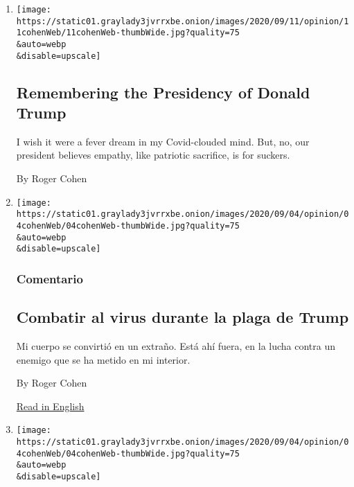 \begin{enumerate}
\def\labelenumi{\arabic{enumi}.}
\item
  \href{/2020/09/11/opinion/trump-lies-military-coronavirus.html}{}

  \texttt{[image: https://static01.graylady3jvrrxbe.onion/images/2020/09/11/opinion/11cohenWeb/11cohenWeb-thumbWide.jpg?quality=75\\\&auto=webp\\\&disable=upscale]}

  \hypertarget{remembering-the-presidency-of-donald-trump}{%
  \subsection{Remembering the Presidency of Donald
  Trump}\label{remembering-the-presidency-of-donald-trump}}

  I wish it were a fever dream in my Covid-clouded mind. But, no, our
  president believes empathy, like patriotic sacrifice, is for suckers.

  By Roger Cohen
\item
  \href{/es/2020/09/07/espanol/opinion/coronavirus-donald-trump.html}{}

  \texttt{[image: https://static01.graylady3jvrrxbe.onion/images/2020/09/04/opinion/04cohenWeb/04cohenWeb-thumbWide.jpg?quality=75\\\&auto=webp\\\&disable=upscale]}

  \hypertarget{comentario}{%
  \subsubsection{Comentario}\label{comentario}}

  \hypertarget{combatir-al-virus-durante-la-plaga-de-trump}{%
  \subsection{Combatir al virus durante la plaga de
  Trump}\label{combatir-al-virus-durante-la-plaga-de-trump}}

  Mi cuerpo se convirtió en un extraño. Está ahí fuera, en la lucha
  contra un enemigo que se ha metido en mi interior.

  By Roger Cohen

  \href{https://www.nytimes3xbfgragh.onion/2020/09/04/opinion/coronavius-donald-trump.html}{Read
  in English}
\item
  \href{/2020/09/04/opinion/coronavius-donald-trump.html}{}

  \texttt{[image: https://static01.graylady3jvrrxbe.onion/images/2020/09/04/opinion/04cohenWeb/04cohenWeb-thumbWide.jpg?quality=75\\\&auto=webp\\\&disable=upscale]}


\end{enumerate}
